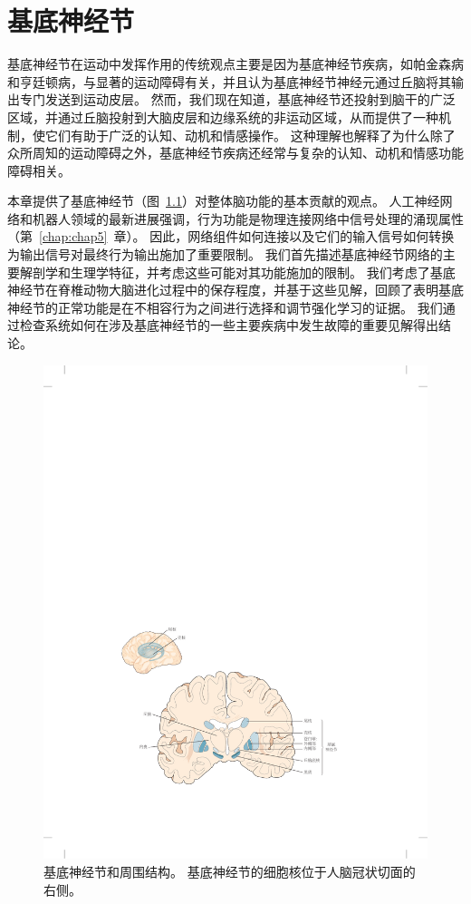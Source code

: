 \chapter{基底神经节} \label{chap:chap38}

基底神经节在运动中发挥作用的传统观点主要是因为基底神经节疾病，如帕金森病和亨廷顿病，与显著的运动障碍有关，并且认为基底神经节神经元通过丘脑将其输出专门发送到运动皮层。
然而，我们现在知道，基底神经节还投射到脑干的广泛区域，并通过丘脑投射到大脑皮层和边缘系统的非运动区域，从而提供了一种机制，使它们有助于广泛的认知、动机和情感操作。
这种理解也解释了为什么除了众所周知的运动障碍之外，基底神经节疾病还经常与复杂的认知、动机和情感功能障碍相关。




本章提供了基底神经节（图~\ref{fig:38_1}）对整体脑功能的基本贡献的观点。
人工神经网络和机器人领域的最新进展强调，行为功能是物理连接网络中信号处理的涌现属性（第~\ref{chap:chap5}~章）。
因此，网络组件如何连接以及它们的输入信号如何转换为输出信号对最终行为输出施加了重要限制。
我们首先描述基底神经节网络的主要解剖学和生理学特征，并考虑这些可能对其功能施加的限制。
我们考虑了基底神经节在脊椎动物大脑进化过程中的保存程度，并基于这些见解，回顾了表明基底神经节的正常功能是在不相容行为之间进行选择和调节强化学习的证据。
我们通过检查系统如何在涉及基底神经节的一些主要疾病中发生故障的重要见解得出结论。


\begin{figure}[htbp]
	\centering
	\includegraphics[width=1.0\linewidth]{chap38/fig_38_1}
	\caption{基底神经节和周围结构。
		基底神经节的细胞核位于人脑冠状切面的右侧\cite{nieuwenhuys2007human}。}
	\label{fig:38_1}
\end{figure}



